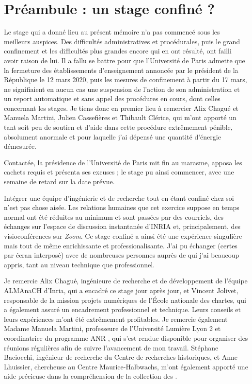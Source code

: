 \section*{Préambule : un stage confiné ?}

Le stage qui a donné lieu au présent mémoire n'a pas commencé sous les meilleurs auspices. Des difficultés administratives et procédurales, puis le grand confinement et les difficultés plus grandes encore qui en ont résulté, ont failli avoir raison de lui. Il a fallu se battre pour que l'Université de Paris admette que la fermeture des établissements d'enseignement annoncée par le président de la République le 12 mars 2020, puis les mesures de confinement à partir du 17 mars, ne signifiaient en aucun cas une suspension de l'action de son administration et un report automatique et sans appel des procédures en cours, dont celles concernant les stages. Je tiens donc en premier lieu à remercier Alix Chagué et Manuela Martini, Julien Cassefières et Thibault Clérice, qui m'ont apporté un tant soit peu de soutien et d'aide dans cette procédure extrêmement pénible, absolument anormale et pour laquelle j'ai dépensé une quantité d'énergie démesurée.

Contactée, la présidence de l'Université de Paris mit fin au marasme, apposa les cachets requis et présenta ses excuses ; le stage pu ainsi commencer, avec une semaine de retard sur la date prévue.

Intégrer une équipe d'ingénierie et de recherche tout en étant confiné chez soi n'est pas chose aisée. Les relations humaines que cet exercice suppose en temps normal ont été réduites au minimum et sont passées par des courriels, des échanges sur l'espace de discussion instantanée d'INRIA et, principalement, des visioconférences sur \textit{Zoom}. Ce stage confiné a ainsi été une expérience singulière mais tout de même enrichissante et professionalisante. J'ai pu échanger (certes par écran interposé) avec de nombreuses personnes auprès de qui j'ai beaucoup appris, tant au niveau technique que professionnel.

Je remercie Alix Chagué, ingénieure de recherche et de développement de l'équipe ALMAnaCH d'Inria, qui a encadré ce stage jour après jour, et Vincent Jolivet, responsable de la mission projets numériques de l'École nationale des chartes, qui a également assuré un encadrement professionnel et technique. Leurs conseils et leurs expériences m'ont été extrêmement profitables. Je remercie également Madame Manuela Martini, professeure de l'Université Lumière Lyon 2 et coordinatrice du programme ANR \timeus{}, qui s'est rendue disponible pour organiser des réunions régulières afin de suivre l'avancement de mon travail. Stéphane Baciocchi, ingénieur de recherche du Centre de recherches historiques, et Anne Lhuissier, chercheuse au Centre Maurice-Halbwachs, m'ont également apporté une aide précieuse dans la compréhension de la collection des \odm.

